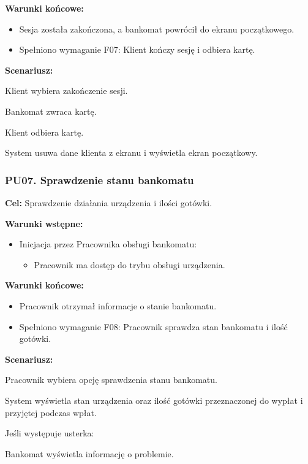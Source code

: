 \documentclass[10pt,a4paper]{article}
\begin{document}
\noindent\textbf{Warunki końcowe:}
\begin{itemize}
    \item Sesja została zakończona, a bankomat powrócił do ekranu początkowego.
    \item Spełniono wymaganie F07: Klient kończy sesję i odbiera kartę.
\end{itemize}

\noindent\textbf{Scenariusz:}
\begin{scenariusz}
    \item Klient wybiera zakończenie sesji.
    \item Bankomat zwraca kartę.
    \item Klient odbiera kartę.
    \item System usuwa dane klienta z ekranu i wyświetla ekran początkowy.
\end{scenariusz}


\subsubsection*{PU07. Sprawdzenie stanu bankomatu}

\noindent\textbf{Cel:} Sprawdzenie działania urządzenia i ilości gotówki.

\noindent\textbf{Warunki wstępne:}
\begin{itemize}
    \item Inicjacja przez Pracownika obsługi bankomatu:
    \begin{itemize}
        \item Pracownik ma dostęp do trybu obsługi urządzenia.
    \end{itemize}
\end{itemize}

\noindent\textbf{Warunki końcowe:}
\begin{itemize}
    \item Pracownik otrzymał informacje o stanie bankomatu.
    \item Spełniono wymaganie F08: Pracownik sprawdza stan bankomatu i ilość gotówki.
\end{itemize}

\noindent\textbf{Scenariusz:}
\begin{scenariusz}
    \item Pracownik wybiera opcję sprawdzenia stanu bankomatu.
    \item System wyświetla stan urządzenia oraz ilość gotówki przeznaczonej do wypłat i przyjętej podczas wpłat.
    \item Jeśli występuje usterka:
    \begin{scenariusz}
        \item Bankomat wyświetla informację o problemie.
    \end{scenariusz}
\end{scenariusz}
\end{document}
